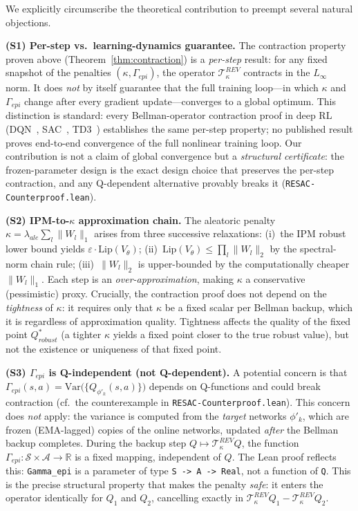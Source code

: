 We explicitly circumscribe the theoretical contribution to preempt several natural objections.

\medskip
\noindent\textbf{(S1) Per-step vs.\ learning-dynamics guarantee.}
The contraction property proven above (Theorem~\ref{thm:contraction}) is a \emph{per-step} result: for any fixed snapshot of the penalties $(\kappa, \Gamma_{epi})$, the operator $\mathcal{T}^{REV}_\kappa$ contracts in the $L_\infty$ norm.  It does \emph{not} by itself guarantee that the full training loop---in which $\kappa$ and $\Gamma_{epi}$ change after every gradient update---converges to a global optimum.
This distinction is standard: every Bellman-operator contraction proof in deep RL (DQN~\cite{Mnih2015DQN}, SAC~\cite{Haarnoja2018SAC}, TD3~\cite{Fujimoto2018TD3}) establishes the same per-step property; no published result proves end-to-end convergence of the full nonlinear training loop.
Our contribution is not a claim of global convergence but a \emph{structural certificate}: the frozen-parameter design is the exact design choice that preserves the per-step contraction, and any Q-dependent alternative provably breaks it (\texttt{RESAC-Counterproof.lean}).

\medskip
\noindent\textbf{(S2) IPM-to-$\kappa$ approximation chain.}
The aleatoric penalty $\kappa = \lambda_{ale}\sum_l\|W_l\|_1$ arises from three successive relaxations: (i)~the IPM robust lower bound yields $\varepsilon\cdot\mathrm{Lip}(V_\theta)$; (ii)~$\mathrm{Lip}(V_\theta) \le \prod_l \|W_l\|_2$ by the spectral-norm chain rule; (iii)~$\|W_l\|_2$ is upper-bounded by the computationally cheaper $\|W_l\|_1$.
Each step is an \emph{over-approximation}, making $\kappa$ a conservative (pessimistic) proxy.
Crucially, the contraction proof does not depend on the \emph{tightness} of $\kappa$: it requires only that $\kappa$ be a fixed scalar per Bellman backup, which it is regardless of approximation quality.  Tightness affects the quality of the fixed point $Q^*_{robust}$ (a tighter $\kappa$ yields a fixed point closer to the true robust value), but not the existence or uniqueness of that fixed point.

\medskip
\noindent\textbf{(S3) $\Gamma_{epi}$ is Q-independent (not Q-dependent).}
A potential concern is that $\Gamma_{epi}(s,a) = \mathrm{Var}\bigl(\{Q_{\phi'_k}(s,a)\}\bigr)$ depends on Q-functions and could break contraction (cf.\ the counterexample in \texttt{RESAC-Counterproof.lean}).
This concern does \emph{not} apply: the variance is computed from the \emph{target} networks $\phi'_k$, which are frozen (EMA-lagged) copies of the online networks, updated \emph{after} the Bellman backup completes.
During the backup step $Q \mapsto \mathcal{T}^{REV}_\kappa Q$, the function $\Gamma_{epi}: \mathcal{S}\times\mathcal{A}\to\mathbb{R}$ is a fixed mapping, independent of $Q$.  The Lean proof reflects this: \texttt{Gamma\_epi} is a parameter of type \texttt{S -> A -> Real}, not a function of \texttt{Q}.
This is the precise structural property that makes the penalty \emph{safe}: it enters the operator identically for $Q_1$ and $Q_2$, cancelling exactly in $\mathcal{T}^{REV}_\kappa Q_1 - \mathcal{T}^{REV}_\kappa Q_2$.


